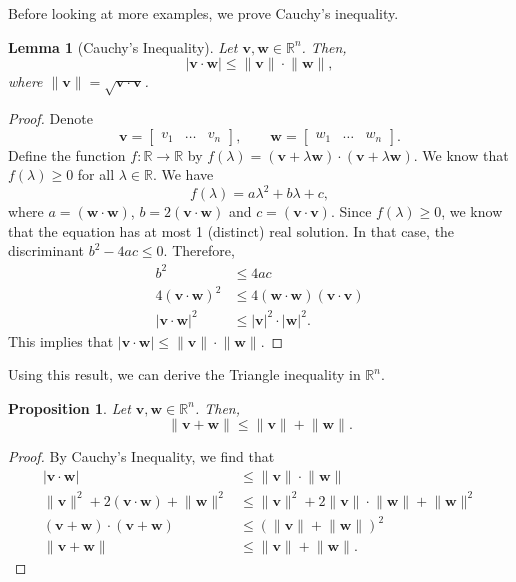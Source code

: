 \documentclass[a4paper, openany]{memoir}
\theoremstyle{definition}
\theoremstyle{plain}
\newtheorem{lemma}[definition]{Lemma}
\newtheorem{proposition}[definition]{Proposition}
\begin{document}
Before looking at more examples, we prove Cauchy's inequality.
\begin{lemma}[Cauchy's Inequality]
Let $\bm{v}, \bm{w} \in \mathbb{R}^n$. Then,
\[\lvert \bm{v} \cdot \bm{w} \rvert \leqslant \lVert \bm{v} \rVert \cdot \lVert \bm{w} \rVert,\]
where $\lVert \bm{v} \rVert = \sqrt{\bm{v} \cdot \bm{v}}$.
\end{lemma}
\begin{proof}
Denote
\[\bm{v} = \begin{bmatrix}
v_1 & \dots & v_n
\end{bmatrix}, \qquad \bm{w} = \begin{bmatrix}
w_1 & \dots & w_n
\end{bmatrix}.\]
Define the function $f: \mathbb{R} \to \mathbb{R}$ by $f(\lambda) = (\bm{v} + \lambda \bm{w}) \cdot (\bm{v} + \lambda \bm{w})$. We know that $f(\lambda) \geqslant 0$ for all $\lambda \in \mathbb{R}$. We have
\[f(\lambda) = a \lambda^2 + b \lambda + c,\]
where $a = (\bm{w} \cdot \bm{w})$, $b = 2(\bm{v} \cdot \bm{w})$ and $c = (\bm{v} \cdot \bm{v})$. Since $f(\lambda) \geqslant 0$, we know that the equation has at most 1 (distinct) real solution. In that case, the discriminant $b^2 - 4ac \leqslant 0$. Therefore,
\begin{align*}
    b^2 &\leqslant 4ac \\
    4(\bm{v} \cdot \bm{w})^2 &\leqslant 4 (\bm{w} \cdot \bm{w})(\bm{v} \cdot \bm{v}) \\
    \lvert \bm{v} \cdot \bm{w} \rvert^2 &\leqslant \lvert \bm{v} \rvert^2 \cdot \lvert \bm{w} \rvert^2.
\end{align*}
This implies that $\lvert \bm{v} \cdot \bm{w} \rvert \leqslant \lVert \bm{v} \rVert \cdot \lVert \bm{w} \rVert$.
\end{proof}
\noindent Using this result, we can derive the Triangle inequality in $\mathbb{R}^n$.
\begin{proposition}
Let $\bm{v}, \bm{w} \in \mathbb{R}^n$. Then,
\[\lVert \bm{v} + \bm{w} \rVert \leqslant \lVert \bm{v} \rVert + \lVert \bm{w} \rVert.\]
\end{proposition}
\begin{proof}
By Cauchy's Inequality, we find that
\begin{align*}
    \lvert \bm{v} \cdot \bm{w} \rvert &\leqslant \lVert \bm{v} \rVert \cdot \lVert \bm{w} \rVert \\
    \lVert \bm{v} \rVert^2 + 2(\bm{v} \cdot \bm{w}) + \lVert \bm{w} \rVert^2 &\leqslant \lVert \bm{v} \rVert^2 + 2\lVert \bm{v} \rVert \cdot \lVert \bm{w} \rVert + \lVert \bm{w} \rVert^2 \\
    (\bm{v} + \bm{w}) \cdot (\bm{v} + \bm{w}) &\leqslant (\lVert \bm{v} \rVert + \lVert \bm{w} \rVert)^2 \\
    \lVert \bm{v} + \bm{w} \rVert &\leqslant \lVert \bm{v} \rVert + \lVert \bm{w} \rVert.
\end{align*}
\end{proof}
\end{document}
